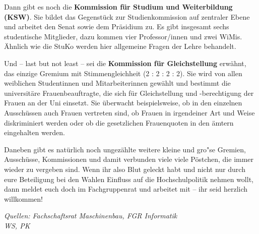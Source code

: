 Dann gibt es noch die \textbf{Kommission für Studium und Weiterbildung (KSW)}. 
Sie bildet das Gegenstück zur Studienkommission auf zentraler Ebene und arbeitet den Senat sowie dem 
Präsidium zu. Es gibt insgesamt sechs studentische Mitglieder, dazu kommen vier Professor/innen und zwei WiMis. 
Ähnlich wie die StuKo werden hier allgemeine Fragen der Lehre behandelt.

Und -- last but not least -- sei die \textbf{Kommission für Gleichstellung} 
erwähnt, das einzige Gremium mit Stimmengleichheit (2 : 2 : 2 : 2). Sie wird von allen 
weiblichen Studentinnen und Mitarbeiterinnen gewählt und bestimmt 
 die universitäre Frauenbeauftragte, die sich für Gleichstellung und 
-berechtigung der Frauen an der Uni einsetzt. Sie überwacht beispielsweise, ob 
in den einzelnen Ausschüssen auch Frauen vertreten sind, ob Frauen in 
irgendeiner Art und Weise diskriminiert werden oder ob die gesetzlichen 
Frauenquoten in den ämtern eingehalten werden. 

Daneben gibt es natürlich noch ungezählte weitere kleine und gro"se Gremien, 
Ausschüsse, Kommissionen und damit verbunden viele viele Pöstchen, die immer 
wieder zu vergeben sind. Wenn ihr also Blut geleckt habt und nicht nur durch 
eure Beteiligung bei den Wahlen Einfluss auf die Hochschulpolitik nehmen wollt, 
dann meldet euch doch im Fachgruppenrat und arbeitet mit -- ihr seid herzlich 
willkommen!

\emph{Quellen: Fachschaftsrat Maschinenbau, FGR Informatik\\WS, PK}
